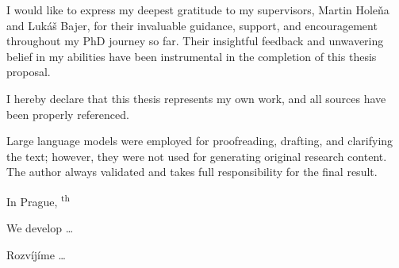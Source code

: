 \begin{thanks}
	I would like to express my deepest gratitude to my supervisors, Martin Holeňa and Lukáš Bajer, for their invaluable guidance, support, and encouragement throughout my PhD journey so far. Their insightful feedback and unwavering belief in my abilities have been instrumental in the completion of this thesis proposal.
\end{thanks}

\begin{declaration}
	I hereby declare that this thesis represents my own work, and all sources have been properly referenced.

	Large language models were employed for proofreading, drafting, and clarifying the text; however, they were not used for generating original research content. The author always validated and takes full responsibility for the final result.

	In Prague, \textsuperscript{th}~~
\end{declaration}

\begin{abstract-english}
We develop \ldots
\end{abstract-english}

\begin{abstract-czech}
Rozvíjíme \ldots
\end{abstract-czech}

